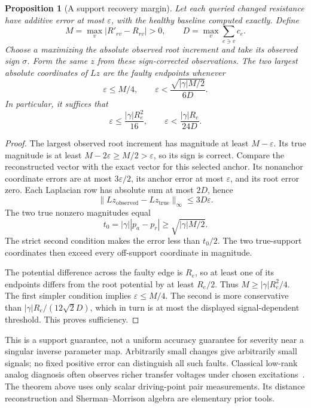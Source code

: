 \documentclass[11pt,letterpaper]{article}
\newtheorem{proposition}[theorem]{Proposition}
\begin{document}
\begin{proposition}[A support recovery margin]\label{prop:universalnoise}
Let each queried changed resistance have additive error at most $\varepsilon$, with the healthy baseline computed exactly. Define
\[
 M=\max_v|R'_{rv}-R_{rv}|>0,\qquad
 D=\max_v\sum_{e\ni v}c_e.
\]
Choose $a$ maximizing the absolute observed root increment and take its observed sign $\sigma$. Form the same $z$ from these sign-corrected observations. The two largest absolute coordinates of $Lz$ are the faulty endpoints whenever
\[
 \varepsilon\le M/4,\qquad
 \varepsilon<\frac{\sqrt{|\gamma|M/2}}{6D}.
\]
In particular, it suffices that
\[
 \varepsilon\le\frac{|\gamma|R_e^2}{16},
 \qquad
 \varepsilon<\frac{|\gamma|R_e}{24D}.
\]
\end{proposition}
\begin{proof}
The largest observed root increment has magnitude at least $M-\varepsilon$. Its true magnitude is at least $M-2\varepsilon\ge M/2>\varepsilon$, so its sign is correct. Compare the reconstructed vector with the exact vector for this selected anchor. Its nonanchor coordinate errors are at most $3\varepsilon/2$, its anchor error at most $\varepsilon$, and its root error zero. Each Laplacian row has absolute sum at most $2D$, hence
\[
 \|Lz_{\mathrm{observed}}-Lz_{\mathrm{true}}\|_\infty\le3D\varepsilon.
\]
The two true nonzero magnitudes equal
\[
 t_0=|\gamma||p_a-p_r|
 \ge\sqrt{|\gamma|M/2}.
\]
The strict second condition makes the error less than $t_0/2$. The two true-support coordinates then exceed every off-support coordinate in magnitude.

The potential difference across the faulty edge is $R_e$, so at least one of its endpoints differs from the root potential by at least $R_e/2$. Thus $M\ge|\gamma|R_e^2/4$. The first simpler condition implies $\varepsilon\le M/4$. The second is more conservative than $|\gamma|R_e/(12\sqrt2D)$, which in turn is at most the displayed signal-dependent threshold. This proves sufficiency.
\end{proof}

This is a support guarantee, not a uniform accuracy guarantee for severity near a singular inverse parameter map. Arbitrarily small changes give arbitrarily small signals; no fixed positive error can distinguish all such faults. Classical low-rank analog diagnosis often observes richer transfer voltages under chosen excitations~\cite{TK,LS}. The theorem above uses only scalar driving-point pair measurements. Its distance reconstruction and Sherman--Morrison algebra are elementary prior tools.
\end{document}

